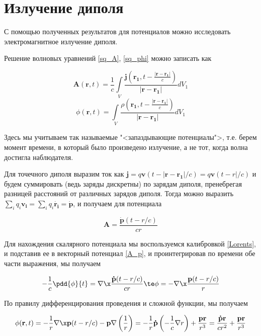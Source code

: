 \documentclass[12pt]{kiarticle}
\begin{document}
\section{Излучение диполя}

С помощью полученных результатов для потенциалов можно исследовать электромагнитное излучение диполя. 

Решение волновых уравнений \eqref{sq_A}, \eqref{sq_phi} можно записать как 

\begin{equation}\label{}
\mathbf{A}(\mathbf{r}, t) = \dfrac{1}{c} \int\limits_V \dfrac{\mathbf{j}(\mathbf{r_1}, t - \frac{|\mathbf{r - r_1}|}{c})}{|\mathbf{r} - \mathbf{r_1}|} dV_1
\end{equation}
\begin{equation}\label{}
\phi(\mathbf{r}, t) =  \int\limits_V \dfrac{\rho(\mathbf{r_1}, t - \frac{|\mathbf{r - r_1}|}{c})}{|\mathbf{r} - \mathbf{r_1}|} dV_1
\end{equation}

Здесь мы учитываем так называемые "<запаздывающие потенциалы">, т.е. берем момент времени, в который было произведено излучение, а не тот, когда волна достигла наблюдателя.

Для точечного диполя выразим ток как $ \mathbf{j} = q \mathbf{v}(t - |\mathbf{r - r_1}|/c) = q \mathbf{v}(t - r|/c) $ и будем суммировать (ведь заряды дискретны) по зарядам диполя, пренебрегая разницей расстояний от различных зарядов диполя. Тогда можно выразить $ \sum_i q_i\mathbf{v_i} = \sum_i q_i\mathbf{\dot{r_i}} = \mathbf{\dot{p}} $, и получаем для потенциала 

\begin{equation}\label{A_p}
\mathbf{A} = \dfrac{\mathbf{\dot{p}}(t - r/c)}{cr}
\end{equation}

Для  нахождения скалярного потенциала мы воспользуемся калибровкой \eqref{Lorents}, и подставив ее в векторный потенциал \eqref{A_p}, и проинтегрировав по времени обе части выражения, мы получаем

\begin{equation}\label{}
- \dfrac{1}{c} \pdd{\phi}{t} = \nabla \x \dfrac{\mathbf{\dot{p}}(t - r/c)}{cr} \te \phi = - \nabla \x \dfrac{\mathbf{p} (t - r/c)}{r}
\end{equation}

По правилу дифференцирования проведения и сложной функции, мы получаем

\begin{equation}\label{}
\phi(\mathbf{r}, t) = -\dfrac{1}{r} \nabla \x \mathbf{p} (t - r/c) - \mathbf{p} \nabla \left( \dfrac{1}{r} \right) = - \dfrac{1}{r}\mathbf{\dot{p}} \left( -\dfrac{1}{c} \nabla r \right) + \dfrac{\mathbf{pr}}{r^3} = \dfrac{\mathbf{\dot{p}r}}{cr^2} + \dfrac{\mathbf{pr}}{r^3}
\end{equation}
\end{document}
